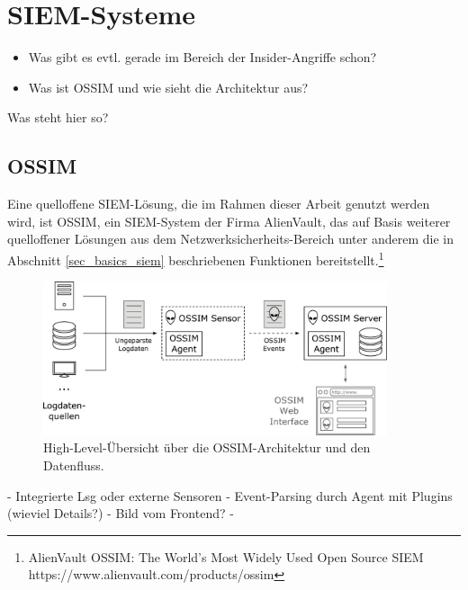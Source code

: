 \section{SIEM-Systeme}

\label{sec_state_siem}

\begin{itemize}
  \item Was gibt es evtl. gerade im Bereich der Insider-Angriffe schon?
  \item Was ist OSSIM und wie sieht die Architektur aus?
\end{itemize}


Was steht hier so?


\subsection*{OSSIM}

Eine quelloffene SIEM-Lösung, die im Rahmen dieser Arbeit genutzt werden wird, ist OSSIM, ein SIEM-System der Firma AlienVault, das auf Basis weiterer quelloffener Lösungen aus dem Netzwerksicherheits-Bereich unter anderem die in Abschnitt \ref{sec_basics_siem} beschriebenen Funktionen bereitstellt.\footnote{
	AlienVault OSSIM: The World’s Most Widely Used Open Source SIEM\\https://www.alienvault.com/products/ossim
}

\begin{figure}[]
    \centering
        \includegraphics[width=0.9\textwidth]{dia/ossim_log_flow.pdf}
    \caption{High-Level-Übersicht über die OSSIM-Architektur und den Datenfluss.}
    \label{fig:ossim_log_flow}
\end{figure}

- Integrierte Lsg oder externe Sensoren
- Event-Parsing durch Agent mit Plugins (wieviel Details?)
- Bild vom Frontend?
- 